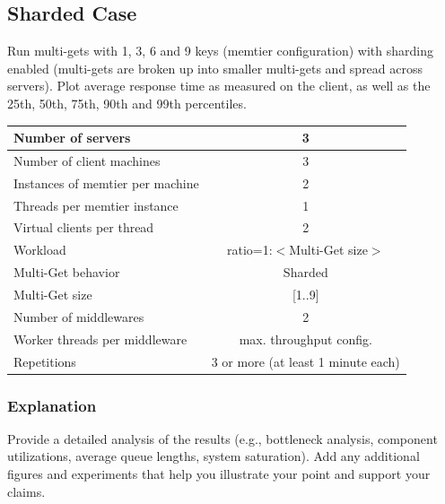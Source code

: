 \documentclass[11pt,a4paper]{article}
\begin{document}
\subsection{Sharded Case}

Run multi-gets with 1, 3, 6 and 9 keys (memtier configuration) with sharding enabled (multi-gets are broken up into smaller multi-gets and spread across servers). Plot average response time as measured on the client, as well as the 25th, 50th, 75th, 90th and 99th percentiles.

\begin{center}
	\scriptsize{
		\begin{tabular}{|l|c|}
			\hline Number of servers                & 3                       \\ 
			\hline Number of client machines        & 3                       \\ 
			\hline Instances of memtier per machine & 2                       \\ 
			\hline Threads per memtier instance     & 1                       \\
			\hline Virtual clients per thread       & 2     		            \\ 
			\hline Workload                         & ratio=1:$<$Multi-Get size$>$             \\
			\hline Multi-Get behavior               & Sharded                 \\
			\hline Multi-Get size                   & [1..9]                  \\
			\hline Number of middlewares            & 2                       \\
			\hline Worker threads per middleware    & max. throughput config. \\
			\hline Repetitions                      & 3 or more (at least 1 minute each)               \\ 
			\hline 
		\end{tabular}
	} 
\end{center}

\subsubsection{Explanation}

Provide a detailed analysis of the results (e.g., bottleneck analysis, component utilizations, average queue lengths, system saturation). Add any additional figures and experiments that help you illustrate your point and support your claims.
\end{document}
